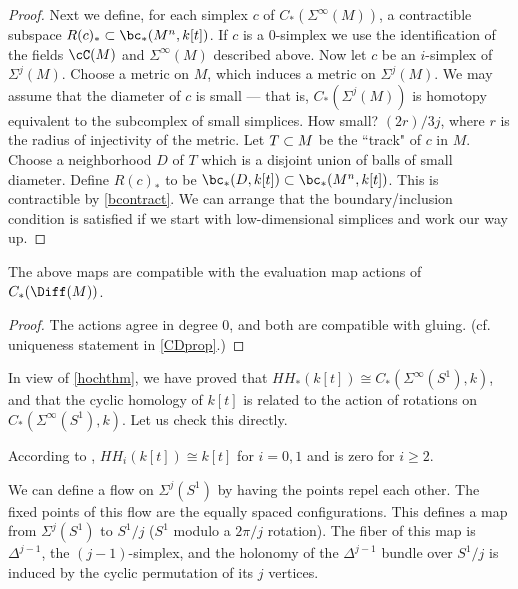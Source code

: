 \begin{proof}
Next we define, for each simplex $c$ of $C_*(\Sigma^\infty(M))$, a contractible subspace
$R(c)_* \sub \bc_*(M^n, k[t])$.
If $c$ is a 0-simplex we use the identification of the fields $\cC(M)$ and 
$\Sigma^\infty(M)$ described above.
Now let $c$ be an $i$-simplex of $\Sigma^j(M)$.
Choose a metric on $M$, which induces a metric on $\Sigma^j(M)$.
We may assume that the diameter of $c$ is small --- that is, $C_*(\Sigma^j(M))$
is homotopy equivalent to the subcomplex of small simplices.
How small?  $(2r)/3j$, where $r$ is the radius of injectivity of the metric.
Let $T\subset M$ be the ``track" of $c$ in $M$.
Choose a neighborhood $D$ of $T$ which is a disjoint union of balls of small diameter.
Define $R(c)_*$ to be $\bc_*(D, k[t]) \sub \bc_*(M^n, k[t])$.
This is contractible by \ref{bcontract}.
We can arrange that the boundary/inclusion condition is satisfied if we start with
low-dimensional simplices and work our way up.

\end{proof}


\begin{prop} \label{ktcdprop}
The above maps are compatible with the evaluation map actions of $C_*(\Diff(M))$.
\end{prop}

\begin{proof}
The actions agree in degree 0, and both are compatible with gluing.
(cf. uniqueness statement in \ref{CDprop}.)
\end{proof}

\medskip

In view of \ref{hochthm}, we have proved that $HH_*(k[t]) \cong C_*(\Sigma^\infty(S^1), k)$,
and that the cyclic homology of $k[t]$ is related to the action of rotations
on $C_*(\Sigma^\infty(S^1), k)$.
Let us check this directly.

According to \cite[3.2.2]{MR1600246}, $HH_i(k[t]) \cong k[t]$ for $i=0,1$ and is zero for $i\ge 2$.

We can define a flow on $\Sigma^j(S^1)$ by having the points repel each other.
The fixed points of this flow are the equally spaced configurations.
This defines a map from $\Sigma^j(S^1)$ to $S^1/j$ ($S^1$ modulo a $2\pi/j$ rotation).
The fiber of this map is $\Delta^{j-1}$, the $(j-1)$-simplex, 
and the holonomy of the $\Delta^{j-1}$ bundle
over $S^1/j$ is induced by the cyclic permutation of its $j$ vertices.

